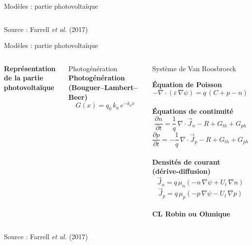 \begin{frame}[t]{Modèles : partie photovoltaïque}
\begin{columns}[T,onlytextwidth]
  \end{columns}

  {\tiny\color{pcNavy!60} Source : Farrell \textit{et al.} (2017)}
\end{frame}


\begin{frame}[t]{Modèles : partie photovoltaïque}

  \vspace{-1em}

  \begin{columns}[T,onlytextwidth]

\begin{pccard}
  \centering
  \figschemaphotovoltaique

  {\scriptsize\bfseries\color{pcNavy}
   Représentation de la partie photovoltaïque}
\end{pccard}


\begin{pcbanner}{Photogénération}
      \centering\scriptsize
      \textbf{Photogénération (Bouguer--Lambert--Beer)}
      \[ G(x) = q_0\,k_a\,e^{-k_a x} \]
      \end{pcbanner}

    
\vspace{-0.5em}
    \begin{pcbanner}{Système de Van Roosbroeck}
      \vspace{0.3em}
      \centering\scriptsize

      \textbf{Équation de Poisson}
      \[ -\nabla\!\cdot\!\left(\varepsilon\,\nabla\psi\right) = q\,(C + p - n) \]\\

\vspace{1em}
      \textbf{Équations de continuité}
      \[ \frac{\partial n}{\partial t} = \frac{1}{q}\,\nabla\!\cdot\!\vec{J}_n - R + G_{th} + G_{ph} \]
      \[ \frac{\partial p}{\partial t} = -\frac{1}{q}\,\nabla\!\cdot\!\vec{J}_p - R + G_{th} + G_{ph} \]\\

\vspace{1em}
      \textbf{Densités de courant (dérive-diffusion)}
      \[ \vec{J}_n = q\,\mu_n\!\left(-n\,\nabla\psi + U_t\,\nabla n\right) \]
      \[ \vec{J}_p = q\,\mu_p\!\left(-p\,\nabla\psi - U_t\,\nabla p\right) \]\\
\vspace{1em}
      \textbf{CL Robin ou Ohmique}
       \vspace{-0.5em}
    \end{pcbanner}

  \end{columns}

  {\tiny\color{pcNavy!60} Source : Farrell \textit{et al.} (2017)}
\end{frame}